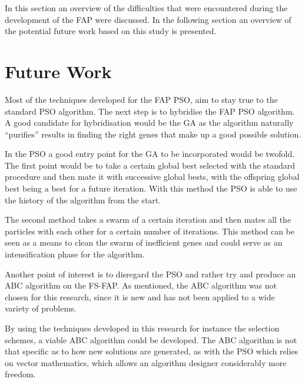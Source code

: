 In this section an overview of the difficulties that were encountered during the development of the FAP were discussed. In the following section an overview of the potential future work based on this study is presented.
\section{Future Work}
Most of the techniques developed for the FAP PSO, aim to stay true to the standard PSO algorithm. The next step is to hybridise the FAP PSO algorithm. A good candidate for hybridisation would be the GA as the algorithm naturally ``purifies'' results in finding the right genes that make up a good possible solution.

In the PSO a good entry point for the GA to be incorporated would be twofold. The first point would be to take a certain global best selected with the standard procedure and then mate it with successive global bests, with the offspring global best being a best for a future iteration. With this method the PSO is able to use the history of the algorithm from the start.

The second method takes a swarm of a certain iteration and then mates all the particles with each other for a certain number of iterations. This method can be seen as a means to clean the swarm of inefficient genes and could serve as an intensification phase for the algorithm.

Another point of interest is to disregard the PSO and rather try and produce an ABC algorithm on the FS-FAP. As mentioned, the ABC algorithm was not chosen for this research, since it is new and has not been applied to a wide variety of problems. 

By using the techniques developed in this research for instance the selection schemes, a viable ABC algorithm could be developed. The ABC algorithm is not that specific as to how new solutions are generated, as with the PSO which relies on vector mathematics, which allows an algorithm designer considerably more freedom.





